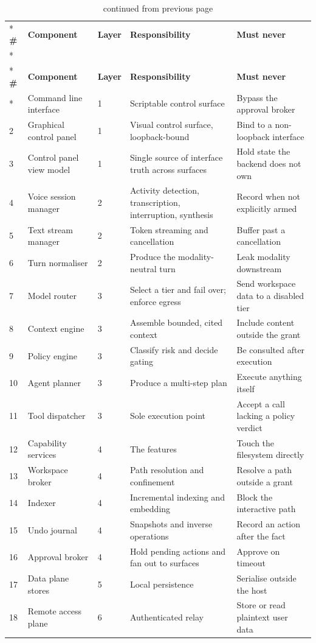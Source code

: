 \documentclass{FastFyp}
\begin{document}
{\small
{}
\begin{longtable}{|p{0.6cm}|p{2.8cm}|p{0.9cm}|p{4.0cm}|p{4.2cm}|}
\caption{Component inventory.}\label{tab:components}\\*
\hline
\textbf{\#} & \textbf{Component} & \textbf{Layer} & \textbf{Responsibility} & \textbf{Must never} \\*
\hline
\endfirsthead
\caption[]{continued from previous page}\\*
\hline
\textbf{\#} & \textbf{Component} & \textbf{Layer} & \textbf{Responsibility} & \textbf{Must never} \\*
\hline
\endhead
\hline
1 & Command line interface & 1 & Scriptable control surface & Bypass the approval broker \\
\hline
2 & Graphical control panel & 1 & Visual control surface, loopback-bound & Bind to a non-loopback interface \\
\hline
3 & Control panel view model & 1 & Single source of interface truth across surfaces & Hold state the backend does not own \\
\hline
4 & Voice session manager & 2 & Activity detection, transcription, interruption, synthesis & Record when not explicitly armed \\
\hline
5 & Text stream manager & 2 & Token streaming and cancellation & Buffer past a cancellation \\
\hline
6 & Turn normaliser & 2 & Produce the modality-neutral turn & Leak modality downstream \\
\hline
7 & Model router & 3 & Select a tier and fail over; enforce egress & Send workspace data to a disabled tier \\
\hline
8 & Context engine & 3 & Assemble bounded, cited context & Include content outside the grant \\
\hline
9 & Policy engine & 3 & Classify risk and decide gating & Be consulted after execution \\
\hline
10 & Agent planner & 3 & Produce a multi-step plan & Execute anything itself \\
\hline
11 & Tool dispatcher & 3 & Sole execution point & Accept a call lacking a policy verdict \\
\hline
12 & Capability services & 4 & The features & Touch the filesystem directly \\
\hline
13 & Workspace broker & 4 & Path resolution and confinement & Resolve a path outside a grant \\
\hline
14 & Indexer & 4 & Incremental indexing and embedding & Block the interactive path \\
\hline
15 & Undo journal & 4 & Snapshots and inverse operations & Record an action after the fact \\
\hline
16 & Approval broker & 4 & Hold pending actions and fan out to surfaces & Approve on timeout \\
\hline
17 & Data plane stores & 5 & Local persistence & Serialise outside the host \\
\hline
18 & Remote access plane & 6 & Authenticated relay & Store or read plaintext user data \\
\hline
\end{longtable}
}
\end{document}
